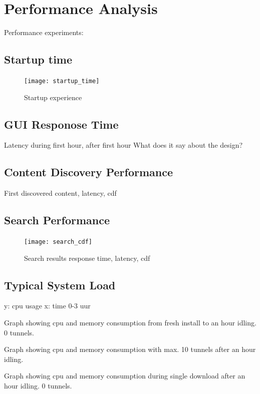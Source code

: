 \chapter{Performance Analysis}
Performance experiments:


\section{Startup time}

\begin{figure}[h]
	\centering
	\texttt{[image: startup\_time]}
	\caption{Startup experience}
	\label{fig:startup_time}
\end{figure}


\section{GUI Responose Time}
Latency during first hour, after first hour
What does it say about the design?


\section{Content Discovery Performance}
First discovered content, latency, cdf


\section{Search Performance}

\begin{figure}[h]
	\centering
	\texttt{[image: search\_cdf]}
	\caption{Search results response time, latency, cdf}
	\label{fig:search_cdf}
\end{figure}


\section{Typical System Load}
y: cpu usage
x: time 0-3 uur

Graph showing cpu and memory consumption from fresh install to an hour idling. 0 tunnels.

Graph showing cpu and memory consumption with max. 10 tunnels after an hour idling.

Graph showing cpu and memory consumption during single download after an hour idling. 0 tunnels.

